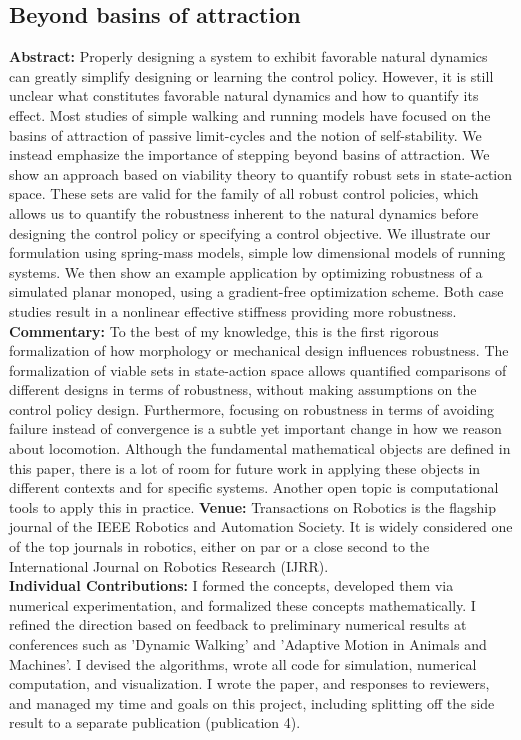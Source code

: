 \subsection{Beyond basins of attraction}
\textbf{Abstract: }
Properly designing a system to exhibit favorable natural dynamics can greatly simplify designing or learning the control policy. However, it is still unclear what constitutes favorable natural dynamics and how to quantify its effect. Most studies of simple walking and running models have focused on the basins of attraction of passive limit-cycles and the notion of self-stability. We instead emphasize the importance of stepping beyond basins of attraction. We show an approach based on viability theory to quantify robust sets in state-action space. These sets are valid for the family of all robust control policies, which allows us to quantify the robustness inherent to the natural dynamics before designing the control policy or specifying a control objective.
We illustrate our formulation using spring-mass models, simple low dimensional models of running systems. We then show an example application by optimizing robustness of a simulated planar monoped, using a gradient-free optimization scheme. Both case studies result in a nonlinear effective stiffness providing more robustness. \\
\textbf{Commentary: }
To the best of my knowledge, this is the first rigorous formalization of how morphology or mechanical design influences robustness. The formalization of viable sets in state-action space allows quantified comparisons of different designs in terms of robustness, without making assumptions on the control policy design. Furthermore, focusing on robustness in terms of avoiding failure instead of convergence is a subtle yet important change in how we reason about locomotion. Although the fundamental mathematical objects are defined in this paper, there is a lot of room for future work in applying these objects in different contexts and for specific systems. Another open topic is computational tools to apply this in practice.
\textbf{Venue: }
Transactions on Robotics is the flagship journal of the IEEE Robotics and Automation Society. It is widely considered one of the top journals in robotics, either on par or a close second to the International Journal on Robotics Research (IJRR). \\
\textbf{Individual Contributions: }
I formed the concepts, developed them via numerical experimentation, and formalized these concepts mathematically. I refined the direction based on feedback to preliminary numerical results at conferences such as 'Dynamic Walking' and 'Adaptive Motion in Animals and Machines'. I devised the algorithms, wrote all code for simulation, numerical computation, and visualization. I wrote the paper, and responses to reviewers, and managed my time and goals on this project, including splitting off the side result to a separate publication (publication 4).
